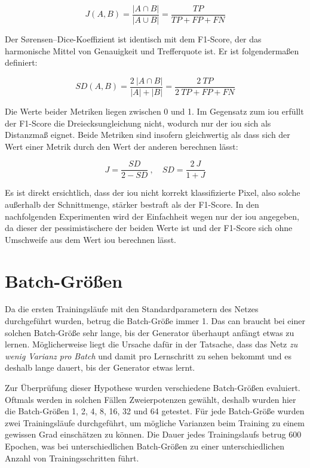 \begin{equation}
J(A, B) = \frac{| A \cap B |}{| A \cup B |} = \frac{TP}{TP + FP + FN}
\end{equation}

Der Sørensen–Dice-Koeffizient ist identisch mit dem F1-Score, der das harmonische Mittel von Genauigkeit und Trefferquote ist.
Er ist folgendermaßen definiert:

\begin{equation}
SD(A, B) = \frac{2 \ | A \cap B |}{| A | + | B |} = \frac{2 \ TP}{2 \ TP + FP + FN}
\end{equation}

Die Werte beider Metriken liegen zwischen 0 und 1.
Im Gegensatz zum \gls{iou} erfüllt der F1-Score die Dreiecksungleichung nicht, wodurch nur der \gls{iou} sich als Distanzmaß eignet.
Beide Metriken sind insofern gleichwertig als dass sich der Wert einer Metrik durch den Wert der anderen berechnen lässt:

\begin{equation}
J = \frac{SD}{2 - SD} \ , \quad SD = \frac{2 \ J}{1 + J}
\end{equation}

Es ist direkt ersichtlich, dass der \gls{iou} nicht korrekt klassifizierte Pixel, also solche außerhalb der Schnittmenge, stärker bestraft als der F1-Score.
In den nachfolgenden Experimenten wird der Einfachheit wegen nur der \gls{iou} angegeben, da dieser der pessimistischere der beiden Werte ist und der F1-Score sich ohne Umschweife aus dem Wert \gls{iou} berechnen lässt.



\section{Batch-Größen}

Da die ersten Trainingsläufe mit den Standardparametern des Netzes durchgeführt wurden, betrug die Batch-Größe immer 1.
Das \gls{can} braucht bei einer solchen Batch-Größe sehr lange, bis der Generator überhaupt anfängt etwas zu lernen.
Möglicherweise liegt die Ursache dafür in der Tatsache, dass das Netz \emph{zu wenig Varianz pro Batch} und damit pro Lernschritt zu sehen bekommt und es deshalb lange dauert, bis der Generator etwas lernt.

Zur Überprüfung dieser Hypothese wurden verschiedene Batch-Größen evaluiert.
Oftmals werden in solchen Fällen Zweierpotenzen gewählt, deshalb wurden hier die Batch-Größen 1, 2, 4, 8, 16, 32 und 64 getestet.
Für jede Batch-Größe wurden zwei Trainingsläufe durchgeführt, um mögliche Varianzen beim Training zu einem gewissen Grad einschätzen zu können.
Die Dauer jedes Trainingslaufs betrug 600 Epochen, was bei unterschiedlichen Batch-Größen zu einer unterschiedlichen Anzahl von Trainingsschritten führt.

